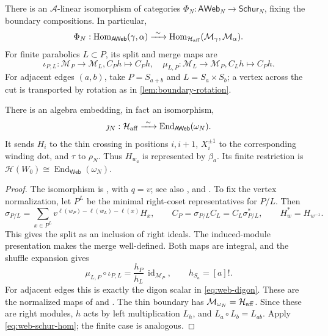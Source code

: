 \documentclass[a4paper,11pt]{amsart}
\numberwithin{equation}{subsection}
\theoremstyle{plain}
\theoremstyle{definition}
\theoremstyle{remark}
\newcommand{\Hom}{\operatorname{Hom}}
\begin{document}
\begin{lemma}\label{lem:vertex-normalization}
There is an $\mathcal A$-linear isomorphism of categories
$\Phi_N:\mathsf{AWeb}_N\to\mathsf{Schur}_N$, fixing the
boundary compositions. In particular,
\begin{gather}\label{eq:web-schur-hom}
\Phi_N:\Hom_{\mathsf{AWeb}}(\gamma,\alpha)
\xrightarrow{\ \sim\ }
\Hom_{\mathcal H_{\rm aff}}(\mathcal M_\gamma,\mathcal M_\alpha).
\end{gather}
For finite parabolics $L\subset P$, its split and merge maps are
\[
\iota_{P,L}:\mathcal M_P\longrightarrow\mathcal M_L,
C_Ph\longmapsto C_Ph,\quad
\mu_{L,P}:\mathcal M_L\longrightarrow\mathcal M_P,
C_Lh\longmapsto C_Ph.
\]
For adjacent edges $(a,b)$, take $P=S_{a+b}$ and
$L=S_a\times S_b$; a vertex across the cut is transported
by rotation as in \autoref{lem:boundary-rotation}.

There is an algebra embedding, in fact an isomorphism,
\begin{gather*}
\jmath_N:\mathcal H_{\rm aff}
\xrightarrow{\ \sim\ }\operatorname{End}_{\mathsf{AWeb}}(\omega_N).
\end{gather*}
It sends $H_i$ to the thin crossing in positions $i,i+1$,
$X_i^{\pm1}$ to the corresponding winding dot, and $\tau$ to
$\rho_N$. Thus $H_{w_a}$ is represented by $\beta_a$.
Its finite restriction is
$\mathcal H(W_0)\cong\operatorname{End}_{\mathsf{Web}}(\omega_N)$.
\end{lemma}

\begin{proof}
The isomorphism is
\cite[Theorem~4.16, Proposition~4.18(1)]{SSW}, with $q=v$;
see also \cite{GreenAffine}, \cite[Theorem~3.22]{TVW}
and \cite{Brundan}. To fix the vertex normalization, let
$P^L$ be the minimal right-coset representatives for $P/L$.
Then
\[
\sigma_{P/L}=\sum_{x\in P^L}
v^{\ell(w_P)-\ell(w_L)-\ell(x)}H_x,\qquad
C_P=\sigma_{P/L}C_L=C_L\sigma_{P/L}^{*},
\qquad H_w^*=H_{w^{-1}}.
\]
This gives the split as an inclusion of right ideals.
The induced-module presentation makes the merge well-defined.
Both maps are integral, and the shuffle expansion gives
\[
\mu_{L,P}\circ\iota_{P,L}
=\frac{h_P}{h_L}\,\operatorname{id}_{\mathcal M_P},
\qquad h_{S_a}=[a]!.
\]
For adjacent edges this is exactly the digon scalar in
\autoref{eq:web-digon}. These are the normalized maps of
\cite{TVW,LatifiTubbenhauer} and \cite[(3.21)--(3.22)]{SSW}.
The thin boundary has $\mathcal M_{\omega_N}=\mathcal H_{\rm aff}$.
Since these are right modules, $h$ acts by left multiplication
$L_h$, and $L_a\circ L_b=L_{ab}$.
Apply \autoref{eq:web-schur-hom}; the finite case is analogous.
\end{proof}
\end{document}
